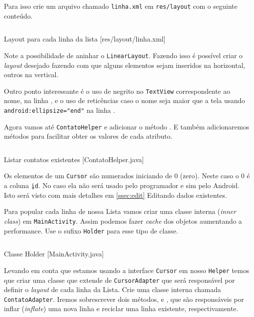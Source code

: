 Para isso crie um arquivo chamado \texttt{linha.xml} em \texttt{res/layout} com o seguinte conteúdo.

\begin{listing}[H]
  \inputminted[linenos=true,frame=bottomline,tabsize=3]{ xml }{ source/linha-1.xml }
  \caption{Layout para cada linha da lista [res/layout/linha.xml]}
\end{listing}

Note a possibilidade de aninhar o \texttt{LinearLayout}. Fazendo isso é possível criar o \textit{layout}
desejado fazendo com que alguns elementos sejam inseridos na horizontal, outros na vertical.

Outro ponto interessante é o uso de negrito no \texttt{TextView} correspondente ao nome, na linha ,
e o uso de reticências caso o nome seja maior que a tela usando \texttt{android:ellipsize="end"} na linha
.

Agora vamos até \texttt{ContatoHelper} e adicionar o método . E também adicionaremos
métodos para facilitar obter os valores de cada atributo.

\begin{listing}[H]
  \inputminted[linenos=true,frame=bottomline,tabsize=3]{ java }{ source/ContatoHelper-3.java }
  \caption{Listar contatos existentes [ContatoHelper.java]}
\end{listing}

Os elementos de um \texttt{Cursor} são numerados iniciando de 0 (zero). Neste caso o 0 é a coluna
\texttt{\b{ }id}. No caso ela não será usado pelo programador e sim pelo Android. Isto
será visto com mais detalhes em \ref{ssec:edit} Editando dados existentes.

Para popular cada linha de nossa Lista vamos criar uma classe interna (\textit{inner class}) em
\texttt{MainActivity}. Assim podemos fazer \textit{cache} dos objetos aumentando a performance.
Use o sufixo \texttt{Holder} para esse tipo de classe.

\begin{listing}[H]
  \inputminted[linenos=true,frame=bottomline,tabsize=3]{ java }{ source/MainActivity-4.java }
  \caption{Classe Holder [MainActivity.java]}
\end{listing}

Levando em conta que estamos usando a interface \texttt{Cursor} em nosso \texttt{Helper} temos
que criar uma classe que extende de \texttt{CursorAdapter} que será responsável por definir o
\textit{layout} de cada linha da Lista. Crie uma classe interna chamada \texttt{ContatoAdapter}.
Iremos sobrescrever dois métodos,  e , que são responsáveis
por inflar (\textit{inflate}) uma nova linha e reciclar uma linha existente, respectivamente.

